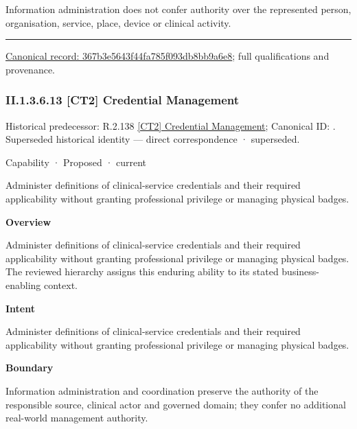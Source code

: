 Information administration does not confer authority over the represented person, organisation, service, place, device or clinical activity.



\medskip\hrule\medskip

{\footnotesize \href{../../../../../../../continuum/strategy/capability/367b3e5643f44fa785f093db8bb9a6e8.md}{Canonical record: 367b3e5643f44fa785f093db8bb9a6e8}; full qualifications and provenance.}\par
\subsubsection*{II.1.3.6.13 [CT2] Credential Management}
\label{navigation:II.1.3.6.13}

{\small Historical predecessor: R.2.138 \hyperref[element:bab3d0ab6eb748978b962ea20fb31640]{[CT2] Credential Management}; Canonical ID: \texttt{}. Superseded historical identity — direct correspondence · superseded.}\par
\label{element:21eed4fc8c924496b16c6ddaa32f3d01}
{\small Capability · Proposed · current}\par

Administer definitions of clinical-service credentials and their required applicability without granting professional privilege or managing physical badges.



\textbf{Overview}



Administer definitions of clinical-service credentials and their required applicability without granting professional privilege or managing physical badges. The reviewed hierarchy assigns this enduring ability to its stated business-enabling context.



\textbf{Intent}



Administer definitions of clinical-service credentials and their required applicability without granting professional privilege or managing physical badges.



\textbf{Boundary}



Information administration and coordination preserve the authority of the responsible source, clinical actor and governed domain; they confer no additional real-world management authority.


